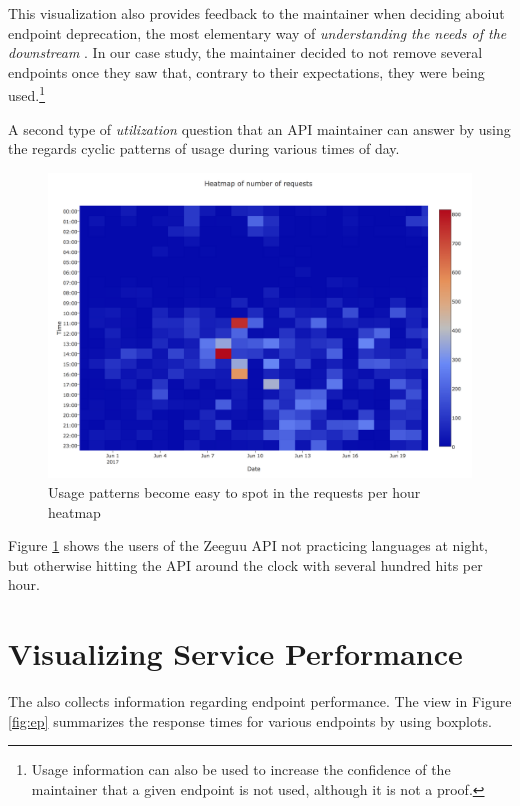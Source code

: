 \documentclass[conference]{IEEEtran}
\begin{document}
  This visualization also provides feedback to the maintainer when deciding aboiut endpoint deprecation, the most elementary way of {\em understanding the needs of the downstream} \cite{Haen14a}. In our case study, the maintainer decided to not remove several endpoints once they saw that, contrary to their expectations, they were being used.\footnote{Usage information can also be used to increase the confidence of the maintainer that a given endpoint is not used, although it is not a proof.}

  \niceseparator

  A second type of {\em utilization} question that an API maintainer can answer by using the \tool regards cyclic patterns of usage during various times of day. 


    \begin{figure}[h!]
      \centering
      \includegraphics[width=0.7\linewidth]{daily_patterns}
      \caption{Usage patterns become easy to spot in the requests per hour heatmap}
      \label{fig:dp}
    \end{figure}


  Figure \ref{fig:dp} shows the users of the Zeeguu API not practicing  languages at night, but otherwise hitting the API around the clock with several hundred hits per hour. 



\section{Visualizing Service Performance}

  The \tool also collects information regarding endpoint performance. The view in Figure \ref{fig:ep} summarizes the response times for various endpoints by using boxplots. 
\end{document}

